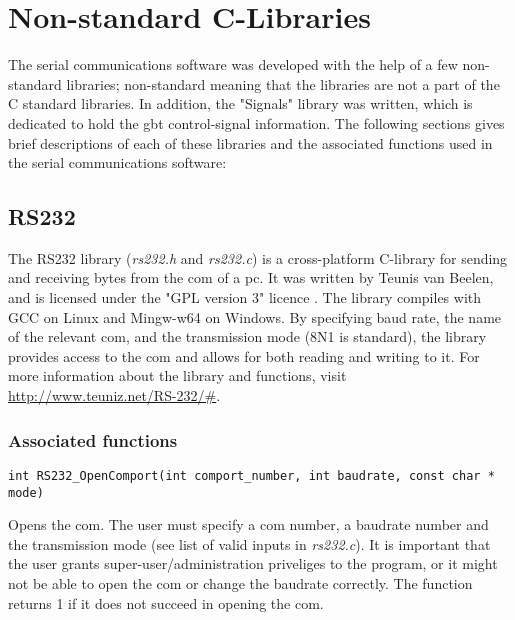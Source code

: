 \documentclass[main.tex]{subfiles}
\begin{document}
\chapter{Non-standard C-Libraries} \label{chap:clibs}

The serial communications software was developed with the help of a few non-standard libraries; non-standard meaning that the libraries are not a part of the C standard libraries. In addition, the "Signals" library was written, which is dedicated to hold the \gls{gbt} control-signal information.
The following sections gives brief descriptions of each of these libraries and the associated functions used in the serial communications software:

\section{RS232} \label{sec:rs232}

The RS232 library (\textit{rs232.h} and \textit{rs232.c}) is a cross-platform C-library for sending and receiving bytes from the \gls{com} of a \acrshort{pc}. It was written by Teunis van Beelen, and is licensed under the "GPL version 3" licence \cite{gpl3}. The library compiles with GCC on Linux and Mingw-w64 on Windows. By specifying baud rate, the name of the relevant \gls{com}, and the transmission mode (8N1 is standard), the library provides access to the \gls{com} and allows for both reading and writing to it. For more information about the library and functions, visit \url{http://www.teuniz.net/RS-232/#}.

\subsection{Associated functions}


\begin{lstlisting}[frame=single] 
int RS232_OpenComport(int comport_number, int baudrate, const char * mode)
\end{lstlisting}
Opens the \gls{com}. The user must specify a \gls{com} number, a baudrate number and the transmission mode (see list of valid inputs in \textit{rs232.c}). It is important that the user grants super-user/administration priveliges to the program, or it might not be able to open the \gls{com} or change the baudrate correctly. The function returns 1 if it does not succeed in opening the \gls{com}.\\
\end{document}
